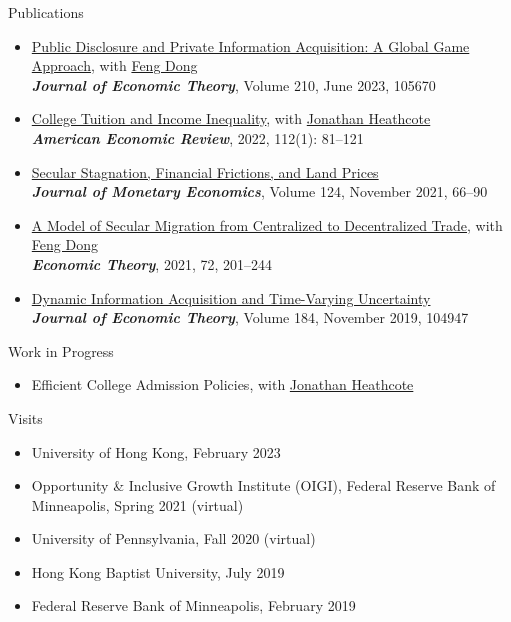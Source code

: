 \documentclass{resume} %
\begin{document}
\begin{rSection}{Publications}
\begin{itemize}
\item[--] \href{https://www.sciencedirect.com/science/article/pii/S0022053123000662}{Public Disclosure and Private Information Acquisition: A Global Game Approach}, with \href{https://fengdongecon.weebly.com/}{Feng Dong} \\
\emph{\textbf{Journal of Economic Theory}}, Volume 210, June 2023, 105670

\item[--] \href{https://www.aeaweb.org/articles?id=10.1257/aer.20181027}{College Tuition and Income Inequality}, with \href{http://www.jonathanheathcote.com/}{Jonathan Heathcote} \\
\emph{\textbf{American Economic Review}}, 2022, 112(1): 81--121

\item[--] \href{https://www.sciencedirect.com/science/article/pii/S0304393221001112}{Secular Stagnation, Financial Frictions, and Land Prices} \\
\emph{\textbf{Journal of Monetary Economics}}, Volume 124, November 2021, 66--90

\item[--] \href{https://link.springer.com/article/10.1007/s00199-020-01280-2}{A Model of Secular Migration from Centralized to Decentralized Trade}, with \href{https://fengdongecon.weebly.com/}{Feng Dong} \\
\emph{\textbf{Economic Theory}}, 2021, 72, 201--244

\item[--] \href{https://www.sciencedirect.com/science/article/pii/S0022053118304721}{Dynamic Information Acquisition and Time-Varying Uncertainty} \\
\emph{\textbf{Journal of Economic Theory}}, Volume 184, November 2019, 104947

\end{itemize}
\end{rSection}

\begin{rSection}{Work in Progress}
	\begin{itemize}
		\item[--] Efficient College Admission Policies, with \href{http://www.jonathanheathcote.com/}{Jonathan Heathcote}
	\end{itemize}
\end{rSection}

\begin{rSection}{Visits}
	\begin{itemize}
		\item[--] University of Hong Kong, February 2023
		\item[--] Opportunity \& Inclusive Growth Institute (OIGI), Federal Reserve Bank of Minneapolis, Spring 2021 (virtual)
		\item[--] University of Pennsylvania, Fall 2020 (virtual)
		\item[--] Hong Kong Baptist University, July 2019
		\item[--] Federal Reserve Bank of Minneapolis, February 2019
	\end{itemize}
\end{rSection}
\end{document}
